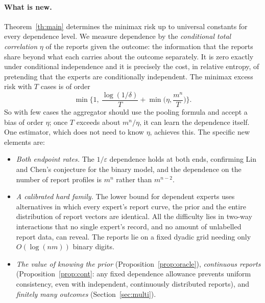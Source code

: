 \documentclass[11pt,a4paper]{article}
\theoremstyle{remark}
\newcommand{\eps}{\varepsilon}
\begin{document}
\paragraph{What is new.}
Theorem~\ref{th:main} determines the minimax risk up to universal constants for every dependence level. We measure dependence by the \emph{conditional total correlation} $\eta$ of the reports given the outcome: the information that the reports share beyond what each carries about the outcome separately. It is zero exactly under conditional independence and it is precisely the cost, in relative entropy, of pretending that the experts are conditionally independent. The minimax excess risk with $T$ cases is of order
\[
\min\Big\{1,\ \frac{\log(1/\delta)}{T}+\min\Big(\eta,\frac{m^n}{T}\Big)\Big\}.
\]
So with few cases the aggregator should use the pooling formula and accept a bias of order $\eta$; once $T$ exceeds about $m^n/\eta$, it can learn the dependence itself. One estimator, which does not need to know $\eta$, achieves this. The specific new elements are:
\begin{itemize}
\item \emph{Both endpoint rates.} The $1/\eps$ dependence holds at both ends, confirming Lin and Chen's conjecture for the binary model, and the dependence on the number of report profiles is $m^n$ rather than $m^{n-2}$.
\item \emph{A calibrated hard family.} The lower bound for dependent experts uses alternatives in which every expert's report curve, the prior and the entire distribution of report vectors are identical. All the difficulty lies in two-way interactions that no single expert's record, and no amount of unlabelled report data, can reveal. The reports lie on a fixed dyadic grid needing only $O(\log(nm))$ binary digits.
\item \emph{The value of knowing the prior} (Proposition~\ref{prop:oracle}), \emph{continuous reports} (Proposition~\ref{prop:cont}: any fixed dependence allowance prevents uniform consistency, even with independent, continuously distributed reports), and \emph{finitely many outcomes} (Section~\ref{sec:multi}).
\end{itemize}
\end{document}

